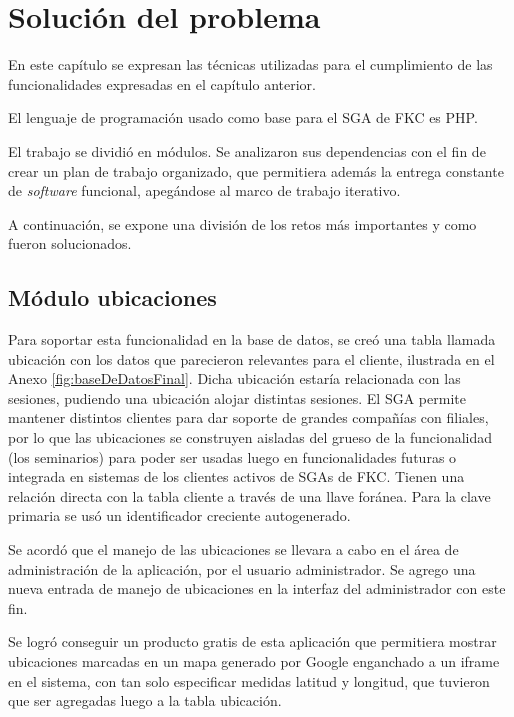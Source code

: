 \chapter{Solución del problema}
\thispagestyle{empty} %

En este capítulo se expresan las técnicas utilizadas para el cumplimiento de las funcionalidades expresadas en el capítulo anterior.

El lenguaje de programación usado como base para el \gls{SGA} de \gls{FKC} es \gls{PHP}.

El trabajo se dividió en módulos. Se analizaron sus dependencias con el fin de crear un plan de trabajo organizado, que permitiera además la entrega constante de \emph{software} funcional, apegándose al marco de trabajo iterativo.

A continuación, se expone una división de los retos más importantes y como fueron solucionados.

	\section{Módulo ubicaciones} %
	\label{sec:ubicaciones}
	
	Para soportar esta funcionalidad en la base de datos, se creó una tabla llamada ubicación con los datos que parecieron relevantes para el cliente, ilustrada en el Anexo \ref{fig:baseDeDatosFinal}. Dicha ubicación estaría relacionada con las sesiones, pudiendo una ubicación alojar distintas sesiones. El SGA permite mantener distintos clientes para dar soporte de grandes compañías con filiales, por lo que las ubicaciones se construyen aisladas del grueso de la funcionalidad (los seminarios) para poder ser usadas luego en funcionalidades futuras o integrada en sistemas de los clientes activos de SGAs de \gls{FKC}. Tienen una relación directa con la tabla cliente a través de una llave foránea. Para la clave primaria se usó un identificador creciente autogenerado.

	Se acordó que el manejo de las ubicaciones se llevara a cabo en el área de administración de la aplicación, por el usuario administrador. Se agrego una nueva entrada de manejo de ubicaciones en la interfaz del administrador con este fin.

	Se logró conseguir un producto gratis de esta aplicación que permitiera mostrar ubicaciones marcadas en un mapa generado por Google enganchado a un iframe en el sistema, con tan solo especificar medidas latitud y longitud, que tuvieron que ser agregadas luego a la tabla ubicación.

